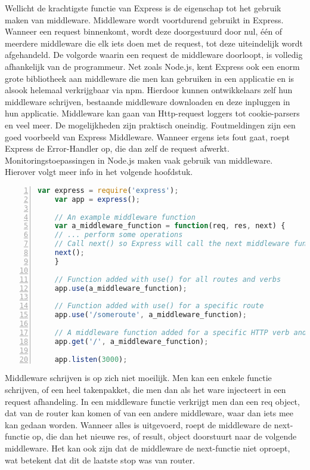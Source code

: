 Wellicht de krachtigste functie van Express is de eigenschap tot het gebruik maken van middleware. Middleware wordt voortdurend gebruikt in Express. Wanneer een request binnenkomt, wordt deze doorgestuurd door nul, één of meerdere middleware die elk iets doen met de request, tot deze uiteindelijk wordt afgehandeld. De volgorde waarin een request de middleware doorloopt, is volledig afhankelijk van de programmeur. Net zoals Node.js, kent Express ook een enorm grote bibliotheek aan middleware die men kan gebruiken in een applicatie en is alsook helemaal verkrijgbaar via npm. Hierdoor kunnen ontwikkelaars zelf hun middleware schrijven, bestaande middleware downloaden en deze inpluggen in hun applicatie. Middleware kan gaan van Http-request loggers tot cookie-parsers en veel meer. De mogelijkheden zijn praktisch oneindig. Foutmeldingen zijn een goed voorbeeld van Express Middleware. Wanneer ergens iets fout gaat, roept Express de Error-Handler op, die dan zelf de request afwerkt. Monitoringstoepassingen in Node.js maken vaak gebruik van middleware. Hierover volgt meer info in het volgende hoofdstuk.

	\begin{lstlisting}[language=JavaScript, breaklines=true,
						numbers=left, frame=single,
						caption={Express code flow voorbeeld.},
						label=code:expressexample]
	var express = require('express');
	var app = express();
	
	// An example middleware function
	var a_middleware_function = function(req, res, next) {
	// ... perform some operations
	// Call next() so Express will call the next middleware function in the chain.
	next();
	}
	
	// Function added with use() for all routes and verbs
	app.use(a_middleware_function);
	
	// Function added with use() for a specific route
	app.use('/someroute', a_middleware_function);
	
	// A middleware function added for a specific HTTP verb and route
	app.get('/', a_middleware_function);
	
	app.listen(3000);
	\end{lstlisting}
	
	
Middleware schrijven is op zich niet moeilijk. Men kan een enkele functie schrijven, of een heel takenpakket, die men dan als het ware injecteert in een request afhandeling. In een middleware functie verkrijgt men dan een req object, dat van de router kan komen of van een andere middleware, waar dan iets mee kan gedaan worden. Wanneer alles is uitgevoerd, roept de middleware de next-functie op, die dan het nieuwe res, of result, object doorstuurt naar de volgende middleware. Het kan ook zijn dat de middleware de next-functie niet oproept, wat betekent dat dit de laatste stop was van router. 

